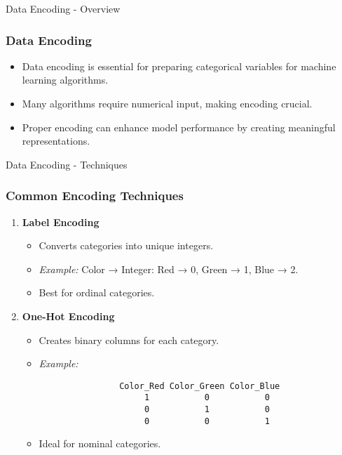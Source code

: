 \documentclass[aspectratio=169]{beamer}
\begin{document}
\begin{frame}[fragile]{Data Encoding - Overview}
    \frametitle{Data Encoding}
    
    \begin{itemize}
        \item Data encoding is essential for preparing categorical variables for machine learning algorithms.
        \item Many algorithms require numerical input, making encoding crucial.
        \item Proper encoding can enhance model performance by creating meaningful representations.
    \end{itemize}
\end{frame}

\begin{frame}[fragile]{Data Encoding - Techniques}
    \frametitle{Common Encoding Techniques}

    \begin{enumerate}
        \item \textbf{Label Encoding}
            \begin{itemize}
                \item Converts categories into unique integers.
                \item \textit{Example:} Color → Integer: Red → 0, Green → 1, Blue → 2.
                \item Best for ordinal categories.
            \end{itemize}
        
        \item \textbf{One-Hot Encoding}
            \begin{itemize}
                \item Creates binary columns for each category.
                \item \textit{Example:}
                \begin{verbatim}
                Color_Red Color_Green Color_Blue
                     1           0           0
                     0           1           0
                     0           0           1
                \end{verbatim}
                \item Ideal for nominal categories.
            \end{itemize}
    \end{enumerate}
\end{frame}
\end{document}
